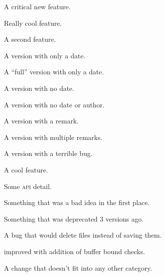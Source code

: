 \documentclass{article}
\begin{document}
\begin{changelog}[author=Rebecca Turner,
	sectioncmd=\subsection,
	title=Example changelog]
\begin{version}
\critical
	\item A critical new feature.
\added
	\item Really cool feature.
	\item A second feature.
\end{version}

\begin{version}[date=2019-01-23, short]
	A version with only a date.
\end{version}

\begin{version}[date=2019-01-23]
\added
	\item A ``full'' version with only a date.
\end{version}

\begin{version}[v=1.1.0, simple]
	\item A version with no date.
\end{version}

\begin{version}[v=1.1.0, author=]
\added
	\item A version with no date or author.
\end{version}

\begin{version}[v=1.0.3, remark=Remark, simple]
	\item A version with a remark.
\end{version}

\begin{version}[v=1.0.2, remarks={Remark 1, Remark 2}, simple]
	\item A version with multiple remarks.
\end{version}

\begin{version}[v=1.0.1, yanked, simple]
	\item A version with a terrible bug.
\end{version}

\begin{version}[v=1.0.0, date=2018-10-26]
\added
	\item A cool feature.
\changed
	\item Some \textsc{api} detail.
\deprecated
	\item Something that was a bad idea in the first place.
\removed
	\item Something that was deprecated 3 versions ago.
\fixed
	\item A bug that would delete files instead of saving them.
\security
	\item improved with addition of buffer bound checks.
\misc
	\item A change that doesn't fit into any other category.
\end{version}


\end{changelog}
\end{document}

